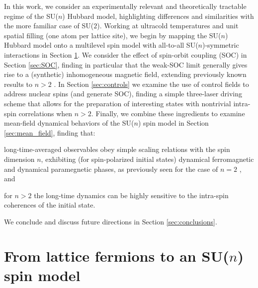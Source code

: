 \documentclass[aps,pra,nofootinbib,twocolumn,superscriptaddress]{revtex4-2}
\newcommand{\1}{\mathds{1}}
\begin{document}
In this work, we consider an experimentally relevant and theoretically tractable regime of the SU($n$) Hubbard model, highlighting differences and similarities with the more familiar case of SU($2$).
Working at ultracold temperatures and unit spatial filling (one atom per lattice site), we begin by mapping the SU($n$) Hubbard model onto a multilevel spin model with all-to-all SU($n$)-symmetric interactions in Section \ref{sec:spin_model}.
We consider the effect of spin-orbit coupling (SOC) in Section \ref{sec:SOC}, finding in particular that the weak-SOC limit generally gives rise to a (synthetic) inhomogeneous magnetic field, extending previously known results to $n>2$ \cite{wall2016synthetic, livi2016synthetic, kolkowitz2016spinorbitcoupled, bromley2018dynamics, he2019engineering}.
In Section \ref{sec:controls} we examine the use of control fields to address nuclear spins (and generate SOC), finding a simple three-laser driving scheme that allows for the preparation of interesting states with nontrivial intra-spin correlations when $n>2$.
Finally, we combine these ingredients to examine mean-field dynamical behaviors of the SU($n$) spin model in Section \ref{sec:mean_field}, finding that:
\begin{enumerate*}
\item long-time-averaged observables obey simple scaling relations with the spin dimension $n$, exhibiting (for spin-polarized initial states) dynamical ferromagnetic and dynamical paramegnetic phases, as previously seen for the case of $n=2$ \cite{smale2019observation, lewis-swan2021cavityqed}, and
\item for $n>2$ the long-time dynamics can be highly sensitive to the intra-spin coherences of the initial state.
\end{enumerate*}
We conclude and discuss future directions in Section \ref{sec:conclusions}.

\section{From lattice fermions to an SU($n$) spin model}
\label{sec:spin_model}
\end{document}
